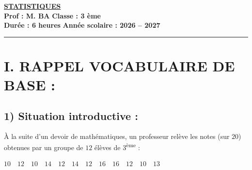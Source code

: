 \documentclass[12pt,a4paper]{article}
\begin{document}
\begin{center}
    \Large\textbf{\underline{\textcolor{myred}{ STATISTIQUES }}}\\[0.2cm]
    \normalsize\textbf{Prof : M. BA} \hfill \textbf{Classe : 3 ème}\\[0.1cm]
    \textbf{Durée : 6 heures} \hfill \textbf{Année scolaire : 2026 -- 2027}
\end{center}
\hrule
\vspace{0.3cm}

\section*{\color{myred}I. RAPPEL VOCABULAIRE DE BASE :}


\subsection*{\color{myred}1) Situation introductive :}


À la suite d'un devoir de mathématiques, un professeur relève les notes (sur $20$) obtenues par un groupe de $12$ élèves de 3\textsuperscript{ème} :
\begin{center}
$10 \quad 12 \quad 10 \quad 14 \quad 12 \quad 14 \quad 12 \quad 16 \quad 16 \quad 12 \quad 10 \quad 13$
\end{center}
\end{document}
